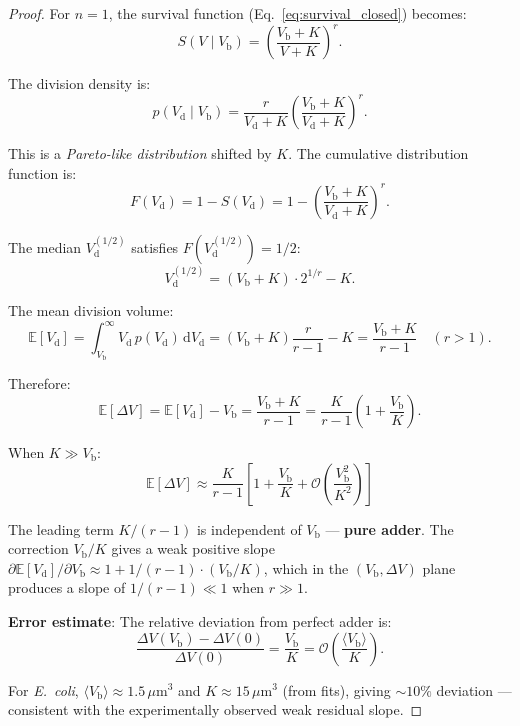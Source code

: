 \documentclass[11pt]{article}
\newcommand{\Vb}{V_{\mathrm{b}}}
\newcommand{\Vd}{V_{\mathrm{d}}}
\newcommand{\DV}{\Delta V}
\newcommand{\E}{\mathbb{E}}
\newcommand{\dd}{\mathrm{d}}
\newcommand{\Order}{\mathcal{O}}
\begin{document}
\begin{proof}
For $n = 1$, the survival function (Eq.~\ref{eq:survival_closed}) becomes:
\begin{equation}
  S(V \mid \Vb) = \left(\frac{\Vb + K}{V + K}\right)^r.
\end{equation}

The division density is:
\begin{equation}
  p(\Vd \mid \Vb) = \frac{r}{\Vd + K}\left(\frac{\Vb + K}{\Vd + K}\right)^r.
\end{equation}

This is a \emph{Pareto-like distribution} shifted by $K$. The cumulative distribution function is:
\begin{equation}
  F(\Vd) = 1 - S(\Vd) = 1 - \left(\frac{\Vb + K}{\Vd + K}\right)^r.
\end{equation}

The median $\Vd^{(1/2)}$ satisfies $F(\Vd^{(1/2)}) = 1/2$:
\begin{equation}
  \Vd^{(1/2)} = (\Vb + K)\cdot 2^{1/r} - K.
\end{equation}

The mean division volume:
\begin{equation}
  \E[\Vd] = \int_{\Vb}^{\infty} \Vd\, p(\Vd)\, \dd\Vd = (\Vb + K)\frac{r}{r-1} - K = \frac{\Vb + K}{r-1}
  \quad (r > 1).
  \label{eq:mean_Vd}
\end{equation}

Therefore:
\begin{equation}
  \E[\DV] = \E[\Vd] - \Vb = \frac{\Vb + K}{r-1} = \frac{K}{r-1}\left(1 + \frac{\Vb}{K}\right).
\end{equation}

When $K \gg \Vb$:
\begin{equation}
  \boxed{\E[\DV] \approx \frac{K}{r-1}\left[1 + \frac{\Vb}{K} + \Order\!\left(\frac{\Vb^2}{K^2}\right)\right]}
\end{equation}

The leading term $K/(r-1)$ is independent of $\Vb$ --- \textbf{pure adder}. The correction $\Vb/K$ gives a weak positive slope $\partial\E[\Vd]/\partial\Vb \approx 1 + 1/(r-1) \cdot (\Vb/K)$, which in the $(\Vb, \DV)$ plane produces a slope of $1/(r-1) \ll 1$ when $r \gg 1$.

\textbf{Error estimate}: The relative deviation from perfect adder is:
\begin{equation}
  \frac{\DV(\Vb) - \DV(0)}{\DV(0)} = \frac{\Vb}{K} = \Order\!\left(\frac{\langle\Vb\rangle}{K}\right).
\end{equation}

For \textit{E.~coli}, $\langle\Vb\rangle \approx 1.5\,\mu\mathrm{m}^3$ and $K \approx 15\,\mu\mathrm{m}^3$ (from fits), giving $\sim 10\%$ deviation --- consistent with the experimentally observed weak residual slope.
\end{proof}
\end{document}
